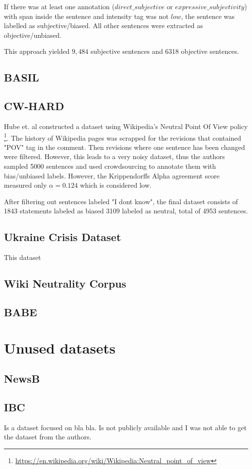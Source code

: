 If there was at least one annotation ($direct\_subjective$ or $expressive\_subjectivity$) with span inside the sentence and intensity tag was not $low$, the sentence was labelled as subjective/biased. All other sentences were extracted as objective/unbiased.

This approach yielded $9,484$ subjective sentences and 6318 objective sentences.

\subsection{BASIL}

\subsection{CW-HARD}
Hube et. al \cite{hube2019neural} constructed a dataset using Wikipedia's Neutral Point Of View policy \footnote{\url{https://en.wikipedia.org/wiki/Wikipedia:Neutral_point_of_view}}. The history of Wikipedia pages was scrapped for the revisions that contained "POV" tag in the comment. Then revisions where one sentence has been changed were filtered. However, this leads to a very noisy dataset, thus the authors sampled 5000 sentences and used crowdsourcing to annotate them with bias/unbiased labels. However, the Krippendorffs Alpha agreement score measured only $\alpha = 0.124$ which is considered low. 

After filtering out sentences labeled "I dont know", the final dataset consists of 1843 statements labeled as biased 3109 labeled as neutral, total of 4953 sentences.

\subsection{Ukraine Crisis Dataset}
This dataset \cite{farber2020multidimensional} 

\subsection{Wiki Neutrality Corpus}
\subsection{BABE}
\section{Unused datasets}
\subsection{NewsB}
\subsection{IBC}
Is a dataset focused on bla bla. Is not publicly available and I was not able to get the dataset from the authors.